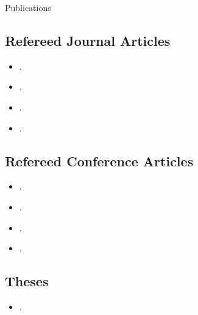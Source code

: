 \begin{rSection}{Publications}



    

\subsection*{Refereed Journal Articles}
\begin{itemize}
    \setlength\itemsep{0.5em}
    \item {}.
    \item {}.
    \item {}.
    \item {}.
\end{itemize}

\subsection*{Refereed Conference Articles}
\begin{itemize}
    \setlength\itemsep{0.5em}
    \item {}.
    \item {}.
    \item {}.
    \item {}.
\end{itemize}

\subsection*{Theses}
\begin{itemize}
    \setlength\itemsep{0.5em}
    \item {}.
\end{itemize}

\end{rSection}